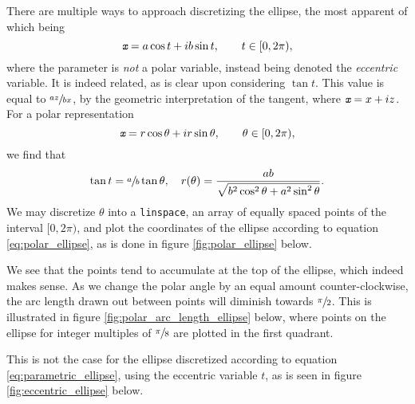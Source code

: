 There are multiple ways to approach discretizing the ellipse, the most apparent of which being
\begin{equation}\label{eq:parametric_ellipse}
  {\textit{\texttt{x}}} = a\cos{t} + ib\sin{t}, \qquad t \in [0, 2\pi),
\end{equation}
where the parameter is \emph{not} a polar variable, instead being denoted the \emph{eccentric} variable.
It is indeed related, as is clear upon considering $\tan{t}$.
This value is equal to $\sfrac{az}{bx}$, by the geometric interpretation of the tangent, where ${\textit{\texttt{x}}} = x + iz$.
For a polar representation
\begin{equation}\label{eq:polar_ellipse}
{\textit{\texttt{x}}} = r\cos{\theta} + ir\sin{\theta}, \qquad \theta \in [0, 2\pi),
\end{equation}
we find that
\[
\tan{t} = \sfrac{a}{b} \tan{\theta}, \quad r(\theta) = \frac{ab}{\sqrt{b^2 \cos^2{\theta} + a^2 \sin^2{\theta}}}.
\]
We may discretize $\theta$ into a \texttt{linspace}, an array of equally spaced points of the interval $[0, 2\pi)$, and plot the coordinates of the ellipse according to equation \eqref{eq:polar_ellipse}, as is done in figure \ref{fig:polar_ellipse} below.
\begin{Figure}
  \centering
  \scalebox{1}{%
    
  }
  \captionsetup{type = figure}
  \caption{Ellipse parametrized with the polar variable $\theta$, according to equation \eqref{eq:polar_ellipse}.}
  \label{fig:polar_ellipse}
\end{Figure}
We see that the points tend to accumulate at the top of the ellipse, which indeed makes sense.
As we change the polar angle by an equal amount counter-clockwise, the arc length drawn out between points will diminish towards $\sfrac{\pi}{2}$.
This is illustrated in figure \ref{fig:polar_arc_length_ellipse} below, where points on the ellipse for integer multiples of $\sfrac{\pi}{8}$ are plotted in the first quadrant.
\begin{Figure}
  \centering
  \scalebox{1}{%
    
  }
  \captionsetup{type = figure}
  \caption{Demonstration that the arc length between points decreases clockwise in the first quadrant as the polar angle $\theta$ approaches $\sfrac{\pi}{2}$.}
  \label{fig:polar_arc_length_ellipse}
\end{Figure}
This is not the case for the ellipse discretized according to equation \eqref{eq:parametric_ellipse}, using the eccentric variable $t$, as is seen in figure \ref{fig:eccentric_ellipse} below.
\begin{Figure}
  \centering
  \scalebox{1}{%
    
  }
  \captionsetup{type = figure}
  \caption{Ellipse parametrized with the eccentric variable $t$, according to equation \eqref{eq:parametric_ellipse}.}
  \label{fig:eccentric_ellipse}
\end{Figure}
